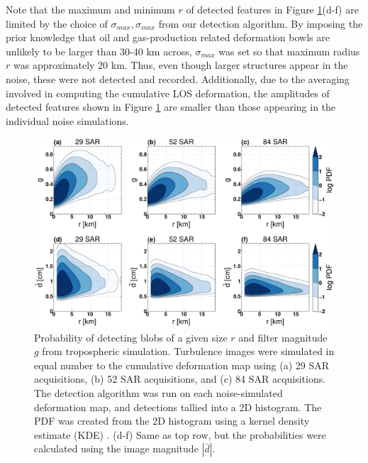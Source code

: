 \documentclass{utexasthesis}
\begin{document}
Note that the maximum and minimum $r$ of detected features in Figure \ref{fig:results-kde}(d-f) are limited by the choice of $\sigma_{max}, \sigma_{max}$ from our detection algorithm. By imposing the prior knowledge that oil and gas-production related deformation bowls are unlikely to be larger than 30-40 km across, $\sigma_{max}$ was set so that maximum radius $r$ was approximately 20 km. Thus, even though larger structures appear in the noise, these were not detected and recorded. Additionally, due to the averaging involved in computing the cumulative LOS deformation, the amplitudes of detected features shown in Figure \ref{fig:results-kde} are smaller than those appearing in the individual noise simulations.


\begin{figure}[hbt!]
\centering 
\includegraphics[width=0.98\linewidth]{paper2/figures/figure_results_kde.pdf}
\caption{
Probability of detecting blobs of a given size $r$ and filter magnitude $g$ from tropospheric simulation. Turbulence images were simulated in equal number to the cumulative deformation map using (a) 29 SAR acquisitions, (b) 52 SAR acquisitions, and (c) 84 SAR acquisitions. The detection algorithm was run on each noise-simulated deformation map, and detections tallied into a 2D histogram. The PDF was created from the 2D histogram using a kernel density estimate (KDE) \cite{Scott2015MultivariateDensityEstimation}.
(d-f) Same as top row, but the probabilities were calculated using the image magnitude $|\bar{d}|$.
}
\label{fig:results-kde}
\end{figure}

\end{document}
